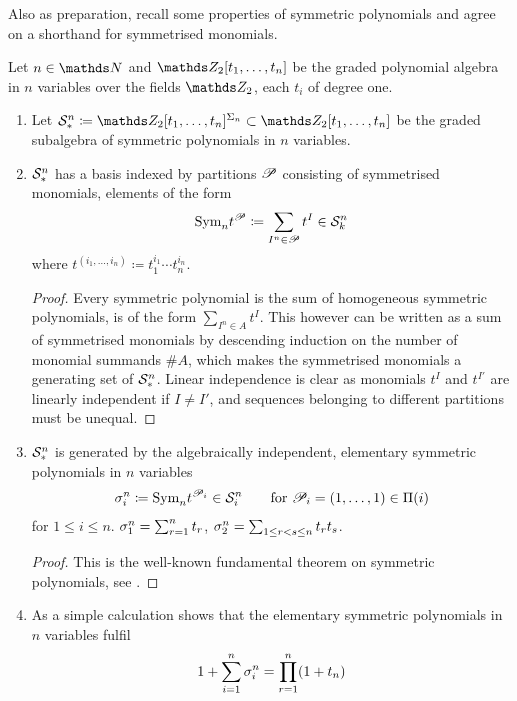 Also as preparation, recall some properties of symmetric polynomials
and agree on a shorthand for symmetrised monomials.
\begin{LemDef}
  Let $n\in\Nat$ and $\Zmod2[t_1,\dotsc,t_n]$ be the graded polynomial
  algebra in $n$ variables over the fields $\Zmod2$, each $t_i$ of
  degree one.
  \begin{enumerate}
  \item Let
    $\Symm{n}_*
    \coloneqq \Zmod2[t_1,\dotsc,t_n]^{\Permutations{n}}
    \subset \Zmod2[t_1,\dotsc,t_n]$
    be the graded subalgebra of symmetric polynomials in $n$ variables.
  \item $\mathcal{S}^{n}_*$ has a basis indexed by partitions $\mathscr{P}$
    consisting of symmetrised monomials, \idest elements of the form
    \begin{gather*}
      \text{\normalfont Sym}_{n} t^{\mathscr{P}} \coloneqq \sum_{I^n\in\mathscr{P}} t^I \in \mathcal{S}^{n}_k
    \end{gather*}
    where $t^{(i_1,\dotsc,i_n)}\coloneqq t_1^{i_1}\dotsm t_n^{i_n}$.
    \begin{proof}
      Every symmetric polynomial is the sum of homogeneous symmetric
      polynomials, \idest is of the form $\sum_{I^n\in A}t^I$. This
      however can be written as a sum of symmetrised monomials by
      descending induction on the number of monomial summands $\#A$,
      which makes the symmetrised monomials a generating set of $\mathcal{S}^{n}_*$.
      Linear independence is clear as monomials $t^I$ and $t^{I'}$ are
      linearly independent if $I\neq I'$, and sequences belonging to
      different partitions must be unequal.
    \end{proof}
  \item $\mathcal{S}^{n}_*$ is generated by the algebraically independent,
    elementary symmetric polynomials in $n$ variables
    \begin{gather*}
      \sigma_{i}^{n}\coloneqq \text{\normalfont Sym}_{n} t^{\mathscr{P}_i}
      \in \mathcal{S}^{n}_i
      \qquad \text{for }
      \mathscr{P}_i = (1,\dotsc,1)
      \in \Pi({i})
    \end{gather*}
    for $1\leq i\leq n$.
    \Forexample
    $\sigma_{1}^{n}=\sum_{r=1}^{n}t_r$,
    $\sigma_{2}^{n}=\sum_{1\leq r<s\leq n} t_r t_s$.
    \begin{proof}
      This is the well-known fundamental theorem on symmetric
      polynomials, see \forexample
      \cite[Chap.~4.4, Satz~1]{bosch2013algebra}. 
    \end{proof}
  \item As a simple calculation shows that the elementary symmetric
    polynomials in $n$ variables fulfil
    \begin{gather}\label{eq:sumelemsymmpoly}
      1 + \sum_{i=1}^{n} \sigma_{i}^{n}
      = \prod_{r=1}^{n}(1+t_n)
    \end{gather}
  \end{enumerate}
\end{LemDef}

